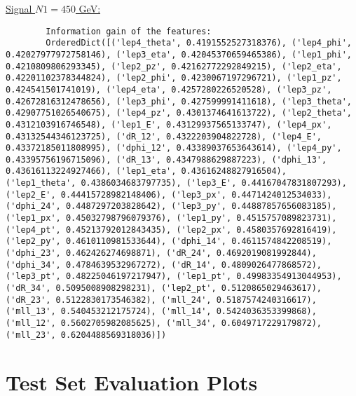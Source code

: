 \documentclass[a4paper, american, 12pt]{report}
\begin{document}
	\underline{Signal $N1=450$ GeV:}
	\begin{lstlisting}
		Information gain of the features:
		OrderedDict([('lep4_theta', 0.4191552527318376), ('lep4_phi', 0.42027977972758146), ('lep3_eta', 0.42045370659465386), ('lep1_phi', 0.4210809806293345), ('lep2_pz', 0.42162772292849215), ('lep2_eta', 0.42201102378344824), ('lep2_phi', 0.4230067197296721), ('lep1_pz', 0.424541501741019), ('lep4_eta', 0.4257280226520528), ('lep3_pz', 0.42672816312478656), ('lep3_phi', 0.427599991411618), ('lep3_theta', 0.42907751026540675), ('lep4_pz', 0.4301374641613722), ('lep2_theta', 0.4312103916746548), ('lep1_E', 0.43129937565133747), ('lep4_px', 0.43132544346123725), ('dR_12', 0.4322203904822728), ('lep4_E', 0.43372185011808995), ('dphi_12', 0.43389037653643614), ('lep4_py', 0.43395756196715096), ('dR_13', 0.4347988629887223), ('dphi_13', 0.43616113224927466), ('lep1_eta', 0.43616248827916504), ('lep1_theta', 0.4386034683797735), ('lep3_E', 0.44167047831807293), ('lep2_E', 0.44415728982148406), ('lep3_px', 0.4471424012534033), ('dphi_24', 0.4487297203828642), ('lep3_py', 0.44887857656083185), ('lep1_px', 0.45032798796079376), ('lep1_py', 0.4515757089823731), ('lep4_pt', 0.45213792012843435), ('lep2_px', 0.4580357692816419), ('lep2_py', 0.4610110981533644), ('dphi_14', 0.4611574842208519), ('dphi_23', 0.462426274698871), ('dR_24', 0.4692019081992844), ('dphi_34', 0.4784639532967272), ('dR_14', 0.4809026477868572), ('lep3_pt', 0.48225046197217947), ('lep1_pt', 0.49983354913044953), ('dR_34', 0.5095008908298231), ('lep2_pt', 0.5120865029463617), ('dR_23', 0.5122830173546382), ('mll_24', 0.5187574240316617), ('mll_13', 0.540453212175724), ('mll_14', 0.5424036353399868), ('mll_12', 0.5602705982085625), ('mll_34', 0.6049717229179872), ('mll_23', 0.6204488569318036)])
	\end{lstlisting}
	
	
	\chapter{Test Set Evaluation Plots}
	\label{appendix:TestSetPlots}
	
\end{document}
